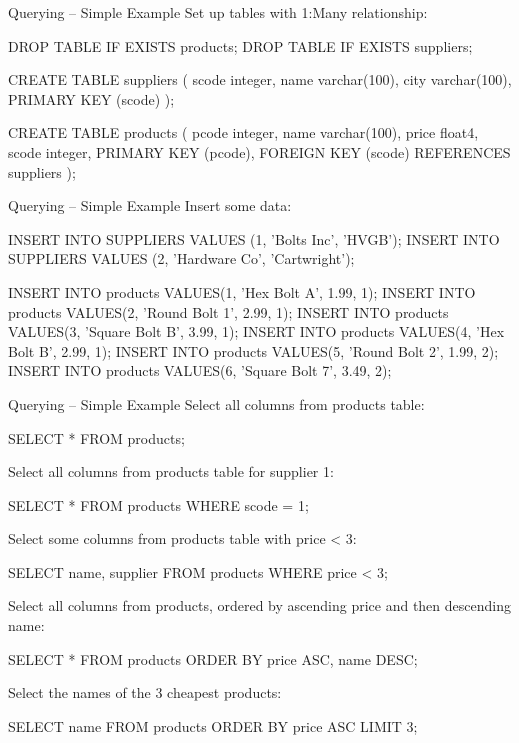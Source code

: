\documentclass[ignorenonframetext,xcolor=x11names]{beamer}
\begin{document}
\begin{frame}[label=full,fragile]{Querying -- Simple Example}
Set up tables with 1:Many relationship:
\footnotesize
\begin{sqlcode}
DROP TABLE IF EXISTS products;
DROP TABLE IF EXISTS suppliers;

CREATE TABLE suppliers (
scode integer,
name varchar(100),
city varchar(100),
PRIMARY KEY (scode) );

CREATE TABLE products (
pcode	integer,
name	varchar(100),
price	float4,
scode   integer,
PRIMARY KEY (pcode),
FOREIGN KEY (scode) REFERENCES suppliers );
\end{sqlcode}
\end{frame}

\begin{frame}[label=full,fragile]{Querying -- Simple Example}
Insert some data:
\footnotesize
\begin{sqlcode}
INSERT INTO SUPPLIERS VALUES (1, 'Bolts Inc', 'HVGB');
INSERT INTO SUPPLIERS VALUES (2, 'Hardware Co', 'Cartwright');

INSERT INTO products VALUES(1, 'Hex Bolt A', 1.99, 1);
INSERT INTO products VALUES(2, 'Round Bolt 1', 2.99, 1);
INSERT INTO products VALUES(3, 'Square Bolt B', 3.99, 1);
INSERT INTO products VALUES(4, 'Hex Bolt B', 2.99, 1);
INSERT INTO products VALUES(5, 'Round Bolt 2', 1.99, 2);
INSERT INTO products VALUES(6, 'Square Bolt 7', 3.49, 2);
\end{sqlcode}
\end{frame}

\begin{frame}[label=full,fragile]{Querying -- Simple Example}
Select all columns from products table:
\begin{sqlcode}
SELECT * FROM products;
\end{sqlcode}
Select all columns from products table for supplier 1:
\begin{sqlcode}
SELECT * FROM products WHERE scode = 1;
\end{sqlcode}
Select some columns from products table with price < 3:
\begin{sqlcode}
SELECT name, supplier FROM products WHERE price < 3;
\end{sqlcode}
Select all columns from products, ordered by ascending price and then descending name:
\begin{sqlcode}
SELECT * FROM products ORDER BY price ASC, name DESC;
\end{sqlcode}
Select the names of the 3 cheapest products:
\begin{sqlcode}
SELECT name FROM products ORDER BY price ASC LIMIT 3;
\end{sqlcode}
\end{frame}
\end{document}

